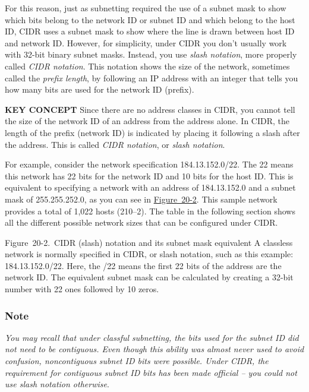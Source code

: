 For this reason, just as subnetting required the use of a subnet mask to
show which bits belong to the network ID or subnet ID and which belong
to the host ID, CIDR uses a subnet mask to show where the line is drawn
between host ID and network ID. However, for simplicity, under CIDR you
don't usually work with 32-bit binary subnet masks. Instead, you use
{\emph{slash notation}}, more properly called {\emph{CIDR notation}}.
This notation shows the size of the network, sometimes called the
{\emph{prefix
length}}, by following an IP address with an integer that tells you how
many bits are used for the network ID (prefix).


{\textbf{KEY CONCEPT}} Since there are no address classes in CIDR, you
cannot tell the size of the network ID of an address from the address
alone. In CIDR, the length of the prefix (network ID) is indicated by
placing it following a
slash after
the address. This is called
{\emph{CIDR
notation}}, or {\emph{slash notation}}.

For example, consider the network specification 184.13.152.0/22. The 22
means this network has 22 bits for the network ID and 10 bits for the
host ID. This is equivalent to specifying a network with an address of
184.13.152.0 and a subnet mask of 255.255.252.0, as you can see in
\protect\hyperlink{ch20s02.htmlux5cux23cidr_slash_notation_and_its_subnet_mask_}{Figure~20-2}.
This sample network provides a total of 1,022 hosts (210--2). The table
in the following section shows all the different possible network sizes
that can be configured under CIDR.





Figure~20-2.~CIDR (slash) notation and its subnet mask equivalent A
classless network is normally specified in CIDR, or slash notation, such
as this example: 184.13.152.0/22. Here, the /22 means the first 22 bits
of the address are the network ID. The equivalent subnet mask can be
calculated by creating a 32-bit number with 22 ones followed by 10
zeros.

\subsubsection[Note]{\texorpdfstring{Note}{Note}}

{\emph{You may recall that under classful subnetting, the bits used for
the subnet ID did not need to be contiguous. Even though this ability
was almost never used to avoid confusion, noncontiguous subnet ID bits
were possible. Under CIDR, the requirement for contiguous subnet ID bits
has been made official -- you could not use slash notation otherwise}}.

